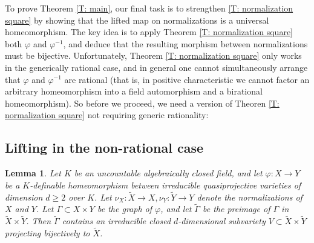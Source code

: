 \documentclass{amsart}
\newtheorem{lemma}[theorem]{Lemma}
\theoremstyle{definition}
\begin{document}
To prove Theorem \ref{T: main}, our final task is to strengthen \ref{T: normalization square} by showing that the lifted map on normalizations is a universal homeomorphism. The key idea is to apply Theorem \ref{T: normalization square} both $\varphi$ and $\varphi^{-1}$, and deduce that the resulting morphism between normalizations must be bijective. Unfortunately, Theorem \ref{T: normalization square} only works in the generically rational case, and in general one cannot simultaneously arrange that $\varphi$ and $\varphi^{-1}$ are rational (that is, in positive characteristic we cannot factor an arbitrary homeomorphism into a field automorphism and a birational homeomorphism). So before we proceed, we need a version of Theoren \ref{T: normalization square} not requiring generic rationality:

\subsection{Lifting in the non-rational case}

\begin{lemma}\label{L: nonrational commuting square}
Let $K$ be an uncountable algebraically closed field, and let $\varphi:X\rightarrow Y$ be a $K$-definable homeomorphism between irreducible quasiprojective varieties of dimension $d\geq 2$ over $K$. Let $\nu_X:\widetilde{X}\rightarrow X,\nu_Y:\widetilde{Y}\rightarrow Y$ denote the normalizations of $X$ and $Y$. Let $\Gamma\subset X\times Y$ be the graph of $\varphi$, and let $\widetilde\Gamma$ be the preimage of $\Gamma$ in $\widetilde X\times\widetilde Y$. Then $\widetilde\Gamma$ contains an irreducible closed $d$-dimensional subvariety $V\subset\widetilde X\times\widetilde Y$ projecting bijectively to $\widetilde X$. 
\end{lemma}
\end{document}
